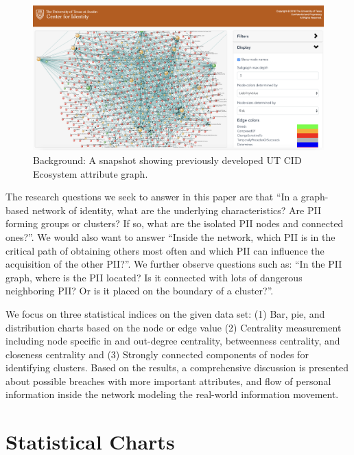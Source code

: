\documentclass[conference]{IEEEtran}
\begin{document}
\begin{figure}[ht]
  \includegraphics[width=\linewidth]{ecosystem_snapshot.png}
  \caption{Background: A snapshot showing previously developed  UT CID Ecosystem attribute graph.}
  \label{fig:ecosystem_whole}
\end{figure}

 The research questions we seek to answer in this paper are that ``In a graph-based network of identity, what are the underlying characteristics? Are PII forming groups or clusters? If so, what are the isolated PII nodes and connected ones?''. We would also want to answer ``Inside the network, which PII is in the critical path of obtaining others most often and which PII can influence the acquisition of the other PII?''. We further observe questions such as: ``In the PII graph, where is the PII located? Is it connected with lots of dangerous neighboring PII? Or is it placed on the boundary of a cluster?''.

We focus on three statistical indices on the given data set: (1) Bar, pie, and distribution charts based on the node or edge value (2) Centrality measurement including node specific in and out-degree centrality, betweenness centrality, and closeness centrality and (3) Strongly connected  components of nodes for identifying clusters. Based on the results, a comprehensive discussion is presented about possible breaches with more important attributes, and flow of personal information inside the network modeling the real-world information movement. 



\section{Statistical Charts}
\end{document}
